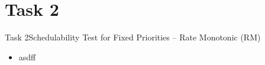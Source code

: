 
\section{Task 2}

\setcounter{task}{1}

\begin{frame}[allowframebreaks]{Task 2}{Schedulability Test for Fixed Priorities – Rate Monotonic (RM)}
  \begin{itemize}
    \item asdff
  \end{itemize}
\end{frame}
